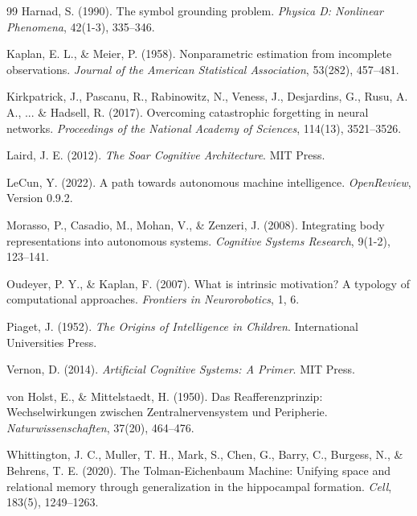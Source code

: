 \documentclass[preprint,12pt]{elsarticle}
\begin{document}
\begin{thebibliography}{99}
Harnad, S. (1990). The symbol grounding problem. \textit{Physica D: Nonlinear Phenomena}, 42(1-3), 335--346.

Kaplan, E. L., \& Meier, P. (1958). Nonparametric estimation from incomplete observations. \textit{Journal of the American Statistical Association}, 53(282), 457--481.

Kirkpatrick, J., Pascanu, R., Rabinowitz, N., Veness, J., Desjardins, G., Rusu, A. A., ... \& Hadsell, R. (2017). Overcoming catastrophic forgetting in neural networks. \textit{Proceedings of the National Academy of Sciences}, 114(13), 3521--3526.

Laird, J. E. (2012). \textit{The Soar Cognitive Architecture}. MIT Press.

LeCun, Y. (2022). A path towards autonomous machine intelligence. \textit{OpenReview}, Version 0.9.2.

Morasso, P., Casadio, M., Mohan, V., \& Zenzeri, J. (2008). Integrating body representations into autonomous systems. \textit{Cognitive Systems Research}, 9(1-2), 123--141.

Oudeyer, P. Y., \& Kaplan, F. (2007). What is intrinsic motivation? A typology of computational approaches. \textit{Frontiers in Neurorobotics}, 1, 6.

Piaget, J. (1952). \textit{The Origins of Intelligence in Children}. International Universities Press.

Vernon, D. (2014). \textit{Artificial Cognitive Systems: A Primer}. MIT Press.

von Holst, E., \& Mittelstaedt, H. (1950). Das Reafferenzprinzip: Wechselwirkungen zwischen Zentralnervensystem und Peripherie. \textit{Naturwissenschaften}, 37(20), 464--476.

Whittington, J. C., Muller, T. H., Mark, S., Chen, G., Barry, C., Burgess, N., \& Behrens, T. E. (2020). The Tolman-Eichenbaum Machine: Unifying space and relational memory through generalization in the hippocampal formation. \textit{Cell}, 183(5), 1249--1263.

\end{thebibliography}
\end{document}
